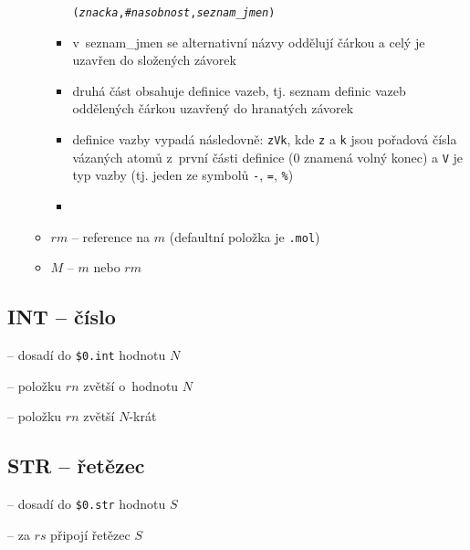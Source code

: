 \begin{itemize}
\begin{itemize}
\begin{itemize}
							  {\tt ({\til}\textit{znacka}{\til},\#\textit{nasobnost},\textit{seznam\_jmen})}
						\item v~seznam\_jmen se alternativní názvy oddělují
							  čárkou a celý je uzavřen do složených závorek
						\item druhá část obsahuje definice vazeb, tj. seznam
							  definic vazeb oddělených čárkou uzavřený do
							  hranatých závorek
						\item definice vazby vypadá následovně: {\tt zVk}, kde
							  {\tt z} a {\tt k} jsou po\-řa\-do\-vá čísla vázaných
							  atomů z~první části definice (0 znamená volný
							  konec) a {\tt V} je typ vazby (tj. jeden ze
							  symbolů {\tt -}, {\tt =}, {\tt \%})
						\item {}
					\end{itemize}
				\item $rm$ -- reference na $m$ (defaultní položka je {\tt .mol})
				\item $M$ -- $m$ nebo $rm$
		  \end{itemize}
\end{itemize}

\subsection{INT -- číslo}
\begin{itemize}
	 -- dosadí do {\tt \$0.int} hodnotu $N$


	 -- položku $rn$ zvětší o~hodnotu $N$


	 -- položku $rn$ zvětší $N$-krát

\end{itemize}

\subsection{STR -- řetězec}
\begin{itemize}
	 -- dosadí do {\tt \$0.str} hodnotu $S$


	 -- za $rs$ připojí řetězec $S$

\end{itemize}


